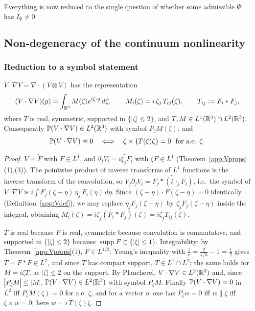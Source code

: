 Everything is now reduced to the single question of whether some
admissible $\Psi$ has $I_\Psi\neq0$.

\subsection{Non-degeneracy of the continuum nonlinearity}
\label{app:nondeg}

\subsubsection*{Reduction to a symbol statement}

\begin{lemma}\label{app:symbol}
$V\cdot\nabla V=\nabla\cdot(V\otimes V)$ has the representation
\[
(V\cdot\nabla V)(y)=\int_{\mathbb R^3}M(\zeta)e^{i\zeta\cdot y}\,d\zeta,
\qquad
M_i(\zeta)=i\,\zeta_j\,T_{ij}(\zeta),\qquad T_{ij}:=F_i*F_j ,
\]
where $T$ is real, symmetric, supported in $\{|\zeta|\le2\}$, and
$T,M\in L^1(\mathbb R^3)\cap L^2(\mathbb R^3)$. Consequently
$\mathbb P(V\cdot\nabla V)\in L^2(\mathbb R^3)$ with symbol $P_\zeta M(\zeta)$, and
\[
\mathbb P(V\cdot\nabla V)\equiv0
\quad\Longleftrightarrow\quad
\zeta\times\big(T(\zeta)\zeta\big)=0\ \text{ for a.e. }\zeta .
\]
\end{lemma}

\begin{proof}
$V=\widetilde F$ with $F\in L^1$, and $\partial_jV_i=\widetilde{i\xi_jF_i}$
with $\xi F\in L^1$ (Theorem~\ref{app:Vprops}(1),(3)). The pointwise
product of inverse transforms of $L^1$ functions is the inverse
transform of the convolution, so
$V_j\partial_jV_i=\widetilde{F_j*(i\,\cdot_j F_i)}$, i.e.\ the symbol of
$V\cdot\nabla V$ is
$i\int F_j(\zeta-\eta)\,\eta_j\,F_i(\eta)\,d\eta$. Since
$(\zeta-\eta)\cdot F(\zeta-\eta)=0$ identically (Definition~\ref{app:Vdef}),
we may replace $\eta_jF_j(\zeta-\eta)$ by $\zeta_jF_j(\zeta-\eta)$
inside the integral, obtaining
$M_i(\zeta)=i\zeta_j(F_i*F_j)(\zeta)=i\zeta_jT_{ij}(\zeta)$.

$T$ is real because $F$ is real, symmetric because convolution is
commutative, and supported in $\{|\zeta|\le2\}$ because
$\operatorname{supp}F\subset\{|\xi|\le1\}$. Integrability: by
Theorem~\ref{app:Vprops}(1), $F\in L^{4/3}$; Young's inequality with
$\frac1r=\frac2{4/3}-1=\frac12$ gives $T=F*F\in L^{2}$, and since $T$
has compact support, $T\in L^1\cap L^2$; the same holds for
$M=i\zeta T$, as $|\zeta|\le2$ on the support. By Plancherel,
$V\cdot\nabla V\in L^2(\mathbb R^3)$ and, since $|P_\zeta M|\le|M|$,
$\mathbb P(V\cdot\nabla V)\in L^2(\mathbb R^3)$ with symbol $P_\zeta M$. Finally
$\mathbb P(V\cdot\nabla V)=0$ in $L^2$ iff $P_\zeta M(\zeta)=0$ for a.e.
$\zeta$, and for a vector $w$ one has $P_\zeta w=0$ iff $w\parallel\zeta$
iff $\zeta\times w=0$; here $w=i\,T(\zeta)\zeta$.
\end{proof}

